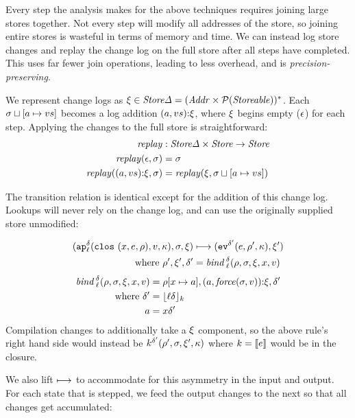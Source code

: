 \documentclass[preprint,onecolumn,9pt]{sigplanconf} %
\begin{document}
Every step the analysis makes for the above techniques requires
joining large stores together. Not every step will modify all
addresses of the store, so joining entire stores is wasteful in terms
of memory and time. We can instead log store changes and replay the
change log on the full store after all steps have completed. This uses
far fewer join operations, leading to less overhead, and is \emph{precision-preserving}.

We represent change logs as $\msdiff \in \StoreDelta = (\Addr \times
  \Set(\Storeable))^*$. Each $\msto\sqcup[\maddr \mapsto \mval{s}]$
 becomes a log addition
$\cons{\ttuple{\maddr}{\mval{s}}}{\msdiff}$, where $\msdiff$ begins
empty ($\mtlst$) for each step. Applying the changes to the full store
is straightforward:
\begin{align*}
\replay &: \StoreDelta \times \Store \to \Store \\
\replay(\mtlst, \msto) &= \msto \\
\replay(\cons{\ttuple{\maddr}{\mval{s}}}{\msdiff}, \msto) &= \replay(\msdiff, \msto\sqcup[\maddr \mapsto \mval{s}])
\end{align*}

The transition relation is identical except for the addition of this change log.
%
Lookups will never rely on the change log, and can use the originally supplied store unmodified:

\begin{align*}
(\ap[^\mcntr_\mlab]{\clos{\mvar,\mexp,\menv},\mval,\mkont},\msto,\msdiff) & \machstep
(\ev[^{\mcntr'}]{\mexp,\menv',\mkont},\msdiff') \\
\text{ where }\menv',\msdiff',\mcntr' &= \mathit{bind\,}^{ \mcntr}_\mlab(\menv,\msto,\msdiff,\mvar,\mval)
\end{align*}
\begin{align*}
\mathit{bind\,}^{\mcntr}_\mlab(\menv, \msto, \msdiff, \mvar, \mval) &= \menv[\mvar \mapsto \maddr], \cons{\ttuple{\maddr}{\force(\msto,\mval)}}{\msdiff}, \mcntr' \\
\text{ where } \mcntr' &= \lfloor \mlab \mcntr\rfloor_k \\
               \maddr &= \mvar\mcntr'
\end{align*}
Compilation changes to additionally take a $\msdiff$ component, so the
above rule's right hand side would instead be $k^{\mcntr'}(\menv',
\msto, \msdiff', \mkont)$ where $k = \compile{e}$ would be in the closure.

We also lift $\machstep$ to accommodate for this asymmetry
in the input and output. For each state that is stepped, we feed the
output changes to the next so that all changes get accumulated:
\end{document}
